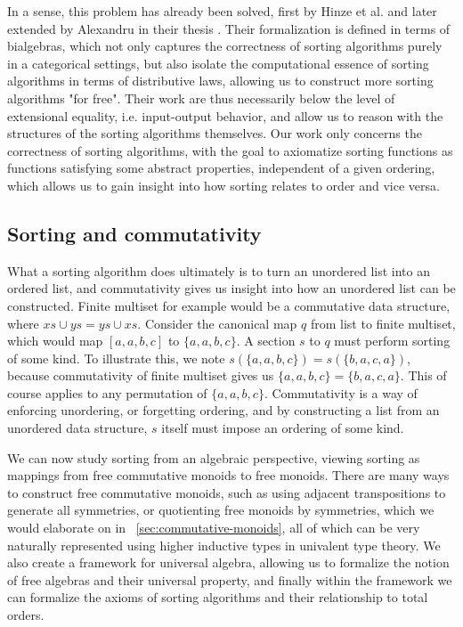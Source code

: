 
In a sense, this problem has already been solved, first by Hinze et al. \cite{10.1145/2364394.2364405}
and later extended by Alexandru in their thesis \cite{alexandru_intrinsically_2023}.
Their formalization is defined in terms of bialgebras, which not
only captures the correctness of sorting algorithms purely in a categorical settings, but
also isolate the computational essence of sorting algorithms in terms of distributive laws,
allowing us to construct more sorting algorithms "for free". Their work are thus necessarily
below the level of extensional equality, i.e. input-output behavior, and allow us to reason
with the structures of the sorting algorithms themselves. Our work only concerns the correctness
of sorting algorithms, with the goal to axiomatize sorting functions as functions satisfying
some abstract properties, independent of a given ordering, which allows us to gain
insight into how sorting relates to order and vice versa.

\subsection*{Sorting and commutativity}
What a sorting algorithm does ultimately is to turn an unordered list into an ordered list,
and commutativity gives us insight into how an unordered list can be constructed.
Finite multiset for example would be a commutative data structure, where $xs \cup ys = ys \cup xs$.
Consider the canonical map $q$ from list to finite multiset, which would map
$[a, a, b, c]$ to $\{a, a, b, c\}$. A section $s$ to $q$ must perform sorting of some kind.
To illustrate this, we note $s(\{a, a, b, c\}) = s(\{b, a, c, a\})$, because commutativity
of finite multiset gives us $\{a, a, b, c\} = \{b, a, c, a\}$. This of course applies to
any permutation of $\{a, a, b, c\}$. Commutativity is a way of enforcing unordering,
or forgetting ordering, and by constructing a list from an unordered data structure, $s$ itself
must impose an ordering of some kind.

We can now study sorting from an algebraic perspective, viewing sorting as mappings from free commutative
monoids to free monoids. There are many ways to construct free commutative monoids, such as using adjacent transpositions to generate all symmetries, or quotienting free monoids by symmetries, which we would
elaborate on in ~\cref{sec:commutative-monoids}, all of which can be very naturally represented
using higher inductive types in univalent type theory. We also
create a framework for universal algebra, allowing us to formalize the notion of free algebras and
their universal property, and finally within the framework we can formalize the axioms of sorting
algorithms and their relationship to total orders.

